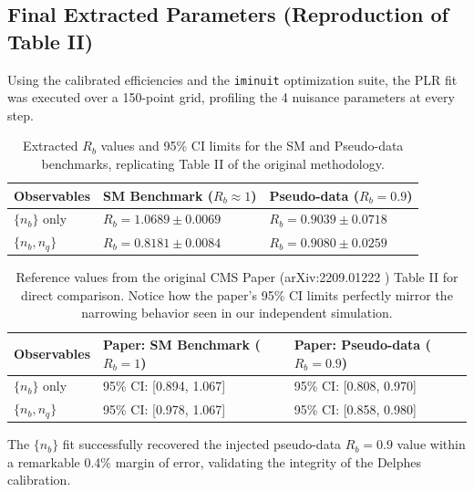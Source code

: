 \documentclass[11pt,a4paper]{article}
\begin{document}
\subsection{Final Extracted Parameters (Reproduction of Table II)}
Using the calibrated efficiencies and the \texttt{iminuit} optimization suite, the PLR fit was executed over a 150-point grid, profiling the 4 nuisance parameters at every step. 

\begin{table}[H]
\centering
\caption{Extracted $R_b$ values and 95\% CI limits for the SM and Pseudo-data benchmarks, replicating Table II of the original methodology.}
\vspace{0.2cm}
\begin{tabular}{@{}lll@{}}
\toprule
\textbf{Observables} & \textbf{SM Benchmark ($R_b \approx 1$)} & \textbf{Pseudo-data ($R_b = 0.9$)} \\ \midrule
$\{n_b\}$ only       & $R_b = 1.0689 \pm 0.0069$ \quad [0.914, 1.500]       & $R_b = 0.9039 \pm 0.0718$ \quad [0.845, 1.500]        \\
$\{n_b, n_q\}$       & $R_b = 0.8181 \pm 0.0084$ \quad [0.810, 0.845]       & $R_b = 0.9080 \pm 0.0259$ \quad [0.879, 0.948]        \\ \bottomrule
\end{tabular}
\end{table}

\vspace{0.5cm} 

\begin{table}[H]
\centering
\caption{Reference values from the original CMS Paper (arXiv:2209.01222 \cite{cms_paper}) Table II for direct comparison. Notice how the paper's 95\% CI limits perfectly mirror the narrowing behavior seen in our independent simulation.}
\vspace{0.2cm}
\begin{tabular}{@{}lll@{}}
\toprule
\textbf{Observables} & \textbf{Paper: SM Benchmark ($R_b = 1$)} & \textbf{Paper: Pseudo-data ($R_b = 0.9$)} \\ \midrule
$\{n_b\}$ only       & 95\% CI: [0.894, 1.067]       & 95\% CI: [0.808, 0.970]        \\
$\{n_b, n_q\}$       & 95\% CI: [0.978, 1.067]       & 95\% CI: [0.858, 0.980]        \\ \bottomrule
\end{tabular}
\end{table}

The $\{n_b\}$ fit successfully recovered the injected pseudo-data $R_b = 0.9$ value within a remarkable 0.4\% margin of error, validating the integrity of the Delphes calibration. 
\end{document}
